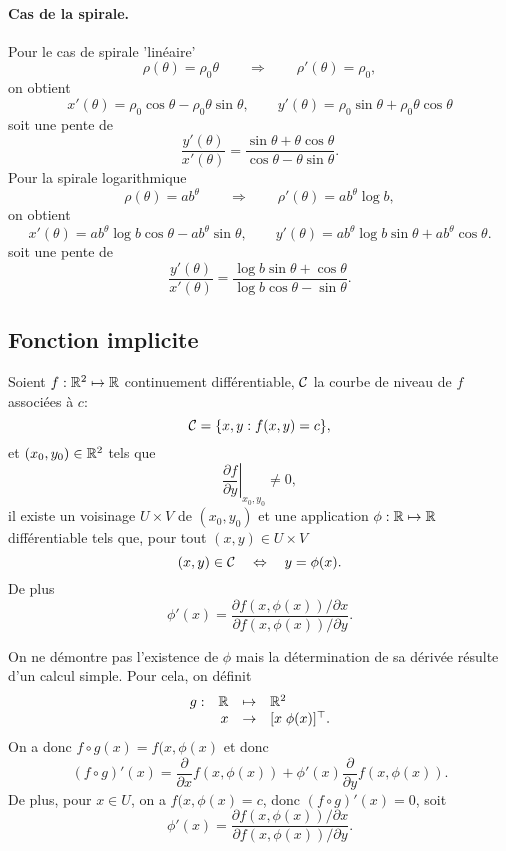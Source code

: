 \paragraph{Cas de la spirale.}
Pour le cas de spirale 'linéaire'
$$
\rho(\theta) = \rho_0 \theta
\qquad \Rightarrow \qquad
\rho'(\theta) = \rho_0,
$$
on obtient
$$
x'(\theta) = \rho_0 \cos \theta - \rho_0 \theta \sin \theta, \qquad 
y'(\theta) = \rho_0 \sin \theta + \rho_0 \theta \cos \theta
$$
soit une pente de 
$$
\frac{y'(\theta)}{x'(\theta)} = \frac{\sin \theta + \theta \cos \theta}{\cos \theta - \theta \sin \theta}.
$$
Pour la spirale logarithmique
$$
\rho(\theta) = a b^\theta
\qquad \Rightarrow \qquad
\rho'(\theta) = a b^\theta \log b,
$$
on obtient
$$
x'(\theta) = a b^\theta \log b \cos \theta - a b^\theta \sin \theta, \qquad 
y'(\theta) = a b^\theta \log b \sin \theta + a b^\theta \cos \theta.
$$
soit une pente de 
$$
\frac{y'(\theta)}{x'(\theta)} = \frac{\log b \sin \theta + \cos \theta}{\log b \cos \theta - \sin \theta}.
$$


\subsection{Fonction implicite}

\begin{theorem*}
  Soient $f : \mathbb{R}^2 \mapsto \mathbb{R}$ continuement différentiable, $\mathcal{C}$ la courbe de niveau de $f$ associées à $c$:
  $$
  \mathcal{C} = \{x, y: f(x, y) = c\},
  $$
  et $(x_0, y_0) \in \mathbb{R}^2$ tels que 
  $$
  \left.\frac{\partial f}{\partial y}\right|_{x_0, y_0} \neq 0,
  $$
  il existe un voisinage $U \times V$ de $(x_0, y_0)$ et une application $\phi : \mathbb{R} \mapsto \mathbb{R}$ différentiable tels que, pour tout $(x, y) \in U \times V$
  $$
  (x, y) \in \mathcal{C} \quad \Leftrightarrow \quad y = \phi(x).
  $$
  De plus
  $$
  \phi'(x) = \frac{\partial f(x, \phi(x)) / \partial x}{\partial f(x, \phi(x)) / \partial y}.
  $$
\end{theorem*}

\proof 
On ne démontre pas l'existence de $\phi$ mais la détermination de sa dérivée résulte d'un calcul simple. Pour cela, on définit
$$
\begin{array}{rrcl}
  g : & \mathbb{R} & \mapsto & \mathbb{R}^2 \\
  & x & \rightarrow & [x \; \phi(x)]^\top.
\end{array}
$$
On a donc $f \circ g (x) = f(x, \phi(x)$ et donc
$$
(f \circ g)'(x) = \frac{\partial}{\partial x} f(x, \phi(x)) + \phi'(x) \frac{\partial}{\partial y} f(x, \phi(x)).
$$
De plus, pour $x \in U$, on a $f(x, \phi(x) = c$, donc $(f \circ g)'(x) = 0$, soit
$$
\phi'(x) = \frac{\partial f(x, \phi(x)) / \partial x}{\partial f(x, \phi(x)) / \partial y}.
$$

\eproof


